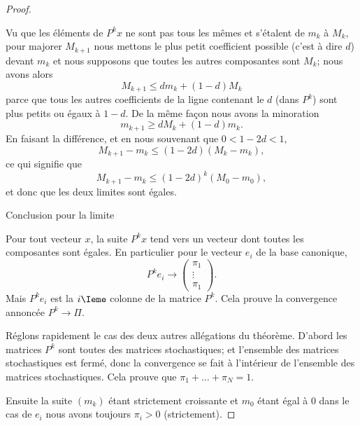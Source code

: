 \begin{proof}
\begin{subproof}
            Vu que les éléments de \( P^kx\) ne sont pas tous les mêmes et s'étalent de \( m_k\) à \( M_k\), pour majorer \( M_{k+1}\) nous mettons le plus petit coefficient possible (c'est à dire \( d\)) devant \( m_k\) et nous supposons que toutes les autres composantes sont \( M_k\); nous avons alors
            \begin{equation}
                M_{k+1}\leq dm_k+(1-d)M_k
            \end{equation}
            parce que tous les autres coefficients de la ligne contenant le \( d\) (dans \( P^k\)) sont plus petits ou égaux à \( 1-d\). De la même façon nous avons la minoration
            \begin{equation}
                m_{k+1}\geq dM_k+(1-d)m_k.
            \end{equation}
            En faisant la différence, et en nous souvenant que \( 0<1-2d<1\),
            \begin{equation}
                M_{k+1}-m_k\leq (1-2d)(M_k-m_k),
            \end{equation}
            ce qui signifie que
            \begin{equation}
                M_{k+1}-m_k\leq (1-2d)^k(M_0-m_0),
            \end{equation}
            et donc que les deux limites sont égales.

        \item[Conclusion pour la limite]

            Pour tout vecteur \( x\), la suite \( P^kx\) tend vers un vecteur dont toutes les composantes sont égales. En particulier pour le vecteur \( e_i\) de la base canonique,
            \begin{equation}
                P^ke_i\to\begin{pmatrix}
                    \pi_1    \\ 
                    \vdots    \\ 
                    \pi_1    
                \end{pmatrix}.
            \end{equation}
            Mais \( P^ke_i\) est la \( i\Ieme\) colonne de la matrice \( P^k\). Cela prouve la convergence annoncée \( P^k\to \Pi\).
    \end{subproof}

    Réglons rapidement le cas des deux autres allégations du théorème. D'abord les matrices \( P^k\) sont toutes des matrices stochastiques; et l'ensemble des matrices stochastiques est fermé, donc la convergence se fait à l'intérieur de l'ensemble des matrices stochastiques. Cela prouve que \( \pi_1+\ldots +\pi_N=1\).

    Ensuite la suite \( (m_k)\) étant strictement croissante et \( m_0\) étant égal à \( 0\) dans le cas de \( e_i\) nous avons toujours \( \pi_i>0\) (strictement).
\end{proof}


